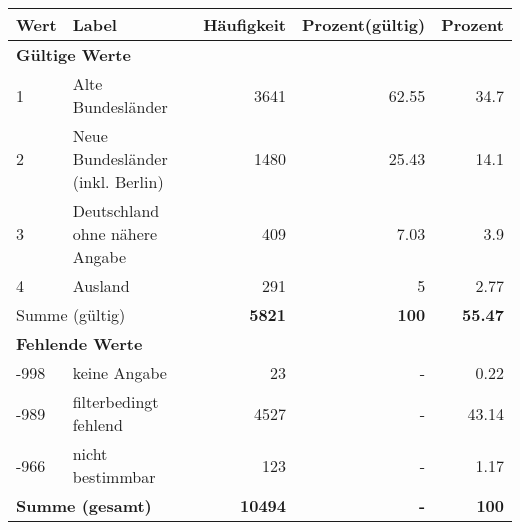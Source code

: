      \begin{longtable}{lXrrr}
     \toprule
     \textbf{Wert} & \textbf{Label} & \textbf{Häufigkeit} & \textbf{Prozent(gültig)} & \textbf{Prozent} \\
     \endhead
     \midrule
     \multicolumn{5}{l}{\textbf{Gültige Werte}}\\

     1 &
     \multicolumn{1}{X}{ Alte Bundesländer   } &


       \num{3641} &
       \num[round-mode=places,round-precision=2]{62,55} &
         \num[round-mode=places,round-precision=2]{34,7} \\

     2 &
     \multicolumn{1}{X}{ Neue Bundesländer (inkl. Berlin)   } &


       \num{1480} &
       \num[round-mode=places,round-precision=2]{25,43} &
         \num[round-mode=places,round-precision=2]{14,1} \\

     3 &
     \multicolumn{1}{X}{ Deutschland ohne nähere Angabe   } &


       \num{409} &
       \num[round-mode=places,round-precision=2]{7,03} &
         \num[round-mode=places,round-precision=2]{3,9} \\

     4 &
     \multicolumn{1}{X}{ Ausland   } &


       \num{291} &
       \num[round-mode=places,round-precision=2]{5} &
         \num[round-mode=places,round-precision=2]{2,77} \\
     \midrule
     \multicolumn{2}{l}{Summe (gültig)} &
       \textbf{\num{5821}} &
     \textbf{100} &
       \textbf{\num[round-mode=places,round-precision=2]{55,47}} \\
     \multicolumn{5}{l}{\textbf{Fehlende Werte}}\\
       -998 &
       keine Angabe &
         \num{23} &
        - &
         \num[round-mode=places,round-precision=2]{0,22} \\
       -989 &
       filterbedingt fehlend &
         \num{4527} &
        - &
         \num[round-mode=places,round-precision=2]{43,14} \\
       -966 &
       nicht bestimmbar &
         \num{123} &
        - &
         \num[round-mode=places,round-precision=2]{1,17} \\
     \midrule
     \multicolumn{2}{l}{\textbf{Summe (gesamt)}} &
          \textbf{\num{10494}} &
        \textbf{-} &
        \textbf{100} \\
     \bottomrule
     \end{longtable}
     
